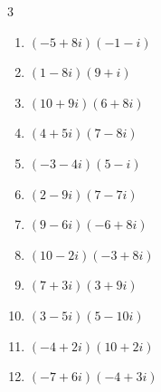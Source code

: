 \begin{multicols}{3}
\begin{enumerate}
        \phantom{$\displaystyle =19+67i$}

  \item $\displaystyle (-5+8i)(-1-i)$

        \phantom{$\displaystyle =13-3i$}

  \item $\displaystyle (1-8i)(9+i)$

        \phantom{$\displaystyle =17-71i$}

  \item $\displaystyle (10+9i)(6+8i)$

        \phantom{$\displaystyle =-12+134i$}

  \item $\displaystyle (4+5i)(7-8i)$

        \phantom{$\displaystyle =68+3i$}

  \item $\displaystyle (-3-4i)(5-i)$

        \phantom{$\displaystyle =-19-17i$}

  \item $\displaystyle (2-9i)(7-7i)$

        \phantom{$\displaystyle =-49-77i$}

  \item $\displaystyle (9-6i)(-6+8i)$

        \phantom{$\displaystyle =-6+108i$}

  \item $\displaystyle (10-2i)(-3+8i)$

        \phantom{$\displaystyle =-14+86i$}

  \item $\displaystyle (7+3i)(3+9i)$

        \phantom{$\displaystyle =-6+72i$}

  \item $\displaystyle (3-5i)(5-10i)$

        \phantom{$\displaystyle =-35-55i$}

  \item $\displaystyle (-4+2i)(10+2i)$

        \phantom{$\displaystyle =-44+12i$}

  \item $\displaystyle (-7+6i)(-4+3i)$

        \phantom{$\displaystyle =10-45i$}

\columnbreak %

\resetques


\end{enumerate}
\end{multicols}
